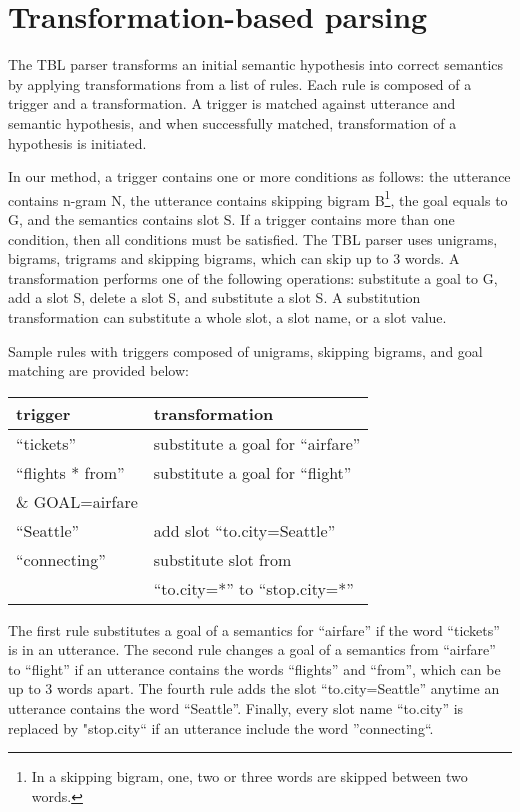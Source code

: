 \documentclass{article}
\begin{document}
\section{Transformation-based parsing} \label{sec:tbl}

The TBL parser transforms an initial semantic hypothesis into correct semantics by applying transformations from a list of rules. Each rule is composed of a trigger and a transformation. A trigger is matched against utterance and semantic hypothesis, and when successfully matched, transformation of a hypothesis is initiated. 

In our method, a trigger contains one or more conditions as follows: the utterance contains n-gram N, the utterance contains skipping bigram B\footnote{In a skipping bigram, one, two or three words are skipped between two words.}, the goal equals to G, and the semantics contains slot S. If a trigger contains more than one condition, then all conditions must be satisfied. The TBL parser uses unigrams, bigrams, trigrams and skipping bigrams, which can skip up to 3 words.
A transformation performs one of the following operations: substitute a goal to G, add a slot S, delete a slot S, and substitute a slot S. A substitution transformation can substitute a whole slot, a slot name, 
or a slot value. 

Sample rules with triggers composed of unigrams, skipping bigrams, and goal matching are provided below:

\vspace{.15cm}
\begin{tabular}{ll}
  trigger & transformation \\
  \hline 
  ``tickets''        & substitute a goal for ``airfare''\\
  ``flights * from'' & substitute a goal for ``flight'' \\
  \& GOAL=airfare     & \\
  ``Seattle''         & add slot ``to.city=Seattle'' \\
  ``connecting''     & substitute slot from\\
                     & ``to.city=*'' to ``stop.city=*'' \\
\end{tabular} 
\vspace{.15cm}

The first rule substitutes a goal of a semantics for ``airfare'' if the word ``tickets'' is in an utterance. The second rule changes a goal of a semantics from ``airfare'' to ``flight'' if an utterance contains the words ``flights'' and ``from'', which can be up to 3 words apart. The fourth rule adds the slot ``to.city=Seattle'' anytime an utterance contains the word ``Seattle''. Finally, every slot name ``to.city'' is replaced by "stop.city`` if an utterance include the word ''connecting``.
\end{document}
